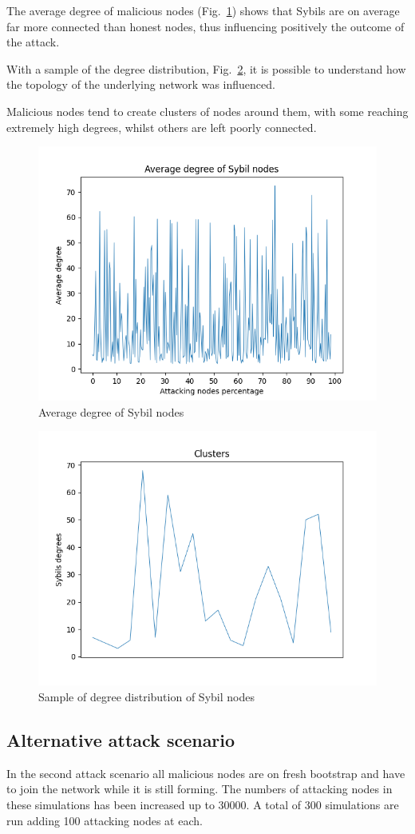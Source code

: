 \documentclass[12pt, letterpaper, twoside]{article}
\begin{document}
The average degree of malicious nodes (Fig.~\ref{fig:in-atk-degree}) shows that Sybils are on average far more connected than honest nodes, thus influencing positively the outcome of the attack.

With a sample of the degree distribution, Fig.~\ref{fig:incluster}, it is possible to understand how the topology of the underlying network was influenced. 

Malicious nodes tend to create clusters of nodes around them, with some reaching extremely high degrees, whilst others are left poorly connected.\\
\begin{figure}[h!]
	\includegraphics[width=.7\textwidth]{pict/results/in-atk-avg-degree.png}
	\centering
	\caption{Average degree of Sybil nodes}
	\label{fig:in-atk-degree}
\end{figure}

\begin{figure}[h!]
	\includegraphics[width=.7\textwidth]{pict/results/in-cluster.png}
	\centering
	\caption{Sample of degree distribution of Sybil nodes}
	\label{fig:incluster}
\end{figure}


\subsection{Alternative attack scenario}\label{sec:external}
In the second attack scenario all malicious nodes are on fresh bootstrap and have to join the network while it is still forming. The numbers of attacking nodes in these simulations has been increased up to 30000. A total of 300 simulations are run adding 100 attacking nodes at each.\\
\end{document}
